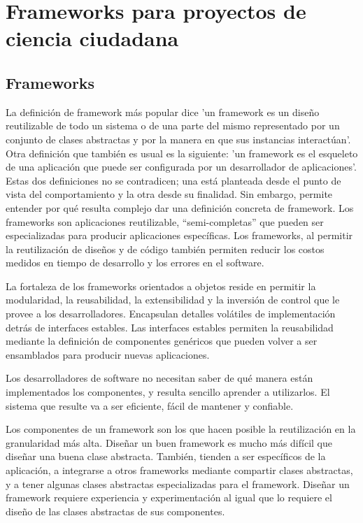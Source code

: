 \chapter{Frameworks para proyectos de ciencia ciudadana}

\section{Frameworks}

	La definición de framework más popular dice 'un framework es un diseño reutilizable de todo un sistema o de una parte del mismo representado por un conjunto de clases abstractas y por la manera en que sus instancias interactúan'. Otra definición que también es usual es la siguiente: 'un framework es el esqueleto de una aplicación que puede ser configurada por un desarrollador de aplicaciones'. Estas dos definiciones no se contradicen; una está planteada desde el punto de vista del comportamiento y la otra desde su finalidad. Sin embargo, permite entender por qué resulta complejo dar una definición concreta de framework. Los frameworks son aplicaciones reutilizable, ``semi-completas'' que pueden ser especializadas para producir aplicaciones específicas. Los frameworks, al permitir la reutilización de diseños y de código también permiten reducir los costos medidos en tiempo de desarrollo y los errores en el software. 
	
	La fortaleza de los frameworks orientados a objetos reside en permitir la modularidad, la reusabilidad, la extensibilidad y la inversión de control que le provee a los desarrolladores. Encapsulan detalles volátiles de implementación detrás de interfaces estables. Las interfaces estables permiten la reusabilidad mediante la definición de componentes genéricos que pueden volver a ser ensamblados para producir nuevas aplicaciones. \cite{fayad1997object}
	
    Los desarrolladores de software no necesitan saber de qué manera están implementados los componentes, y resulta sencillo aprender a utilizarlos. El sistema que resulte va a ser eficiente, fácil de mantener y confiable.\cite{johnson1997frameworks} \cite{fayad1997object}
	
	Los componentes de un framework son los que hacen posible la reutilización en la granularidad más alta. Diseñar un buen framework es mucho más difícil que diseñar una buena clase abstracta. También, tienden a ser específicos de la aplicación, a integrarse a otros frameworks mediante compartir clases abstractas, y a tener algunas clases abstractas especializadas para el framework. Diseñar un framework requiere experiencia y experimentación al igual que lo requiere el diseño de las clases abstractas de sus componentes.\cite{johnson1988designing}

